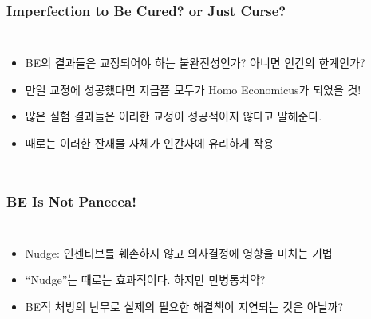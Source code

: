 \documentclass[final]{beamer}
\begin{document}
%
\begin{frame}\frametitle{Imperfection to Be Cured? or Just Curse?}\vspace{2em}
\begin{columns}[c]
\column{18em}
\begin{itemize}
	\item BE의 결과들은 교정되어야 하는 불완전성인가? 아니면 인간의 한계인가?   
	\item 만일 교정에 성공했다면 지금쯤 모두가 Homo Economicus가 되었을 것!
	\item 많은 실험 결과들은 이러한 교정이 성공적이지 않다고 말해준다. 
	\item 때로는 이러한 잔재물 자체가 인간사에 유리하게 작용 
\end{itemize}
\column{12em}
\hspace{-1em}
\end{columns}
%
\end{frame}
%
\begin{frame}\frametitle{BE Is Not Panecea!}\vspace{3.5em}
\begin{columns}[c]
\column{17em}
\begin{itemize}
	\item Nudge: 인센티브를 훼손하지 않고 의사결정에 영향을 미치는 기법
	\item ``Nudge''는 때로는 효과적이다. 하지만 만병통치약?
	\item BE적 처방의 난무로 실제의 필요한 해결책이 지연되는 것은 아닐까?\\
\end{itemize}
\column{13em}
\hspace{0em}
\end{columns}
\end{frame}
\end{document}
